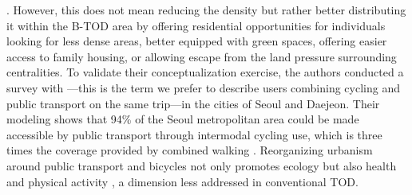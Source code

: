 \begin{refsegment}
{} \textcolor{blue}{\autocite[983]{lee_bicycle-based_2016}}. However, this does not mean reducing the density but rather better distributing it within the \acrshort{B-TOD} area by offering residential opportunities for individuals looking for less dense areas, better equipped with green spaces, offering easier access to family housing, or allowing escape from the land pressure surrounding centralities. To validate their conceptualization exercise, the authors conducted a survey with —this is the term we prefer to describe users combining cycling and public transport on the same trip—in the cities of Seoul and Daejeon. Their modeling shows that 94\% of the Seoul metropolitan area could be made accessible by public transport through intermodal cycling use, which is three times the coverage provided by combined walking \textcolor{blue}{\autocite[982]{lee_bicycle-based_2016}}. Reorganizing urbanism around public transport and bicycles not only promotes ecology but also health and physical activity \textcolor{blue}{\autocite[44]{heran_velo_2020}}, a dimension less addressed in conventional \acrshort{TOD}.%


\end{refsegment}
